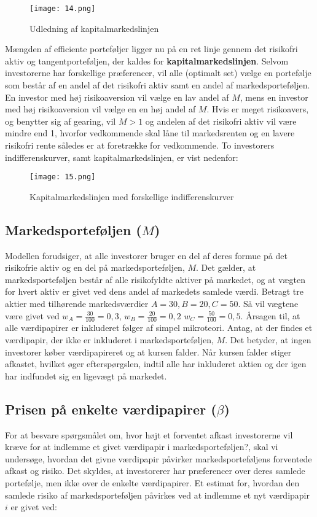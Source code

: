 \documentclass[10pt,reqno, usenames]{article}
\begin{document}
\begin{figure}[h]
     \centering
     \texttt{[image: 14.png]}
     \caption{Udledning af kapitalmarkedslinjen}
     \label{Figur 2}
\end{figure} 


\newpage
Mængden af efficiente porteføljer ligger nu på en ret linje gennem det
risikofri aktiv og tangentporteføljen, der kaldes for \textbf{kapitalmarkedslinjen}. Selvom investorerne har forskellige præferencer, vil alle (optimalt set) vælge en portefølje som består af en andel af det risikofri aktiv samt en andel af markedsporteføljen. En investor med høj risikoaversion vil vælge en lav andel af $M$, mens en investor med høj risikoaversion vil vælge en en høj andel af $M$. Hvis er meget risikoavers, og benytter sig af gearing, vil $M>1$ og andelen af det risikofri aktiv vil være mindre end 1, hvorfor vedkommende skal låne til markedsrenten og en lavere risikofri rente således er at foretrække for vedkommende. To investorers indifferenskurver, samt kapitalmarkedslinjen, er vist nedenfor:  

\begin{figure}[h]
     \centering
     \texttt{[image: 15.png]}
     \caption{Kapitalmarkedslinjen med forskellige indifferenskurver}
     \label{Figur 2}
\end{figure} 

\subsection{Markedsporteføljen ($M$)}
Modellen forudsiger, at alle investorer bruger en del af deres formue på det risikofrie aktiv og en del på markedsporteføljen, $M$. Det gælder, at markedsporteføljen består af alle risikofyldte aktiver på markedet, og at vægten for hvert aktiv er givet ved dens andel af markedets samlede værdi. Betragt tre aktier med tilhørende markedsværdier $A=30, B=20, C=50$. Så vil vægtene være givet ved $w_A=\frac{30}{100}=0,3$, $w_B=\frac{20}{100}=0,2$ $w_C=\frac{50}{100}=0,5$. Årsagen til, at alle værdipapirer er inkluderet følger af simpel mikroteori. Antag, at der findes et værdipapir, der ikke er inkluderet i markedsporteføljen, $M$. Det betyder, at ingen investorer køber værdipapireret og at kursen falder. Når kursen falder stiger afkastet, hvilket øger efterspørgslen, indtil alle har inkluderet aktien og der igen har indfundet sig en ligevægt på markedet. 

\subsection{Prisen på enkelte værdipapirer ($\beta$)}
For at besvare spørgsmålet om, hvor højt et forventet afkast investorerne vil kræve for at indlemme et givet værdipapir i markedsporteføljen?, skal vi undersøge, hvordan det givne værdipapir påvirker markedsporteføljens forventede afkast og risiko. Det skyldes, at investorerer har præferencer over deres samlede portefølje, men ikke over de enkelte værdipapirer. Et estimat for, hvordan den samlede risiko af markedsporteføljen påvirkes ved at indlemme et nyt værdipapir $i$ er givet ved: 
\end{document}
